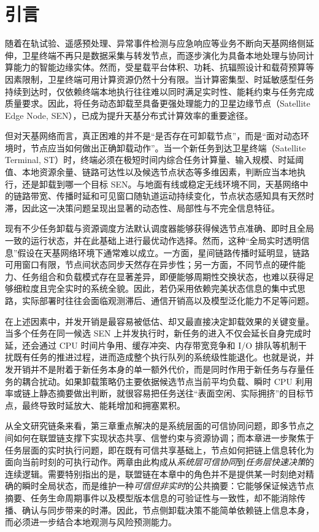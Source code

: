 \section{引言}
\label{sec:problem_statement}

随着在轨试验、遥感预处理、异常事件检测与应急响应等业务不断向天基网络侧延伸，卫星终端不再只是数据采集与转发节点，而逐步演化为具备本地处理与协同计算能力的智能边缘实体。然而，受星载平台体积、功耗、抗辐照设计和载荷预算等因素限制，卫星终端可用计算资源仍然十分有限。当计算密集型、时延敏感型任务持续到达时，仅依赖终端本地执行往往难以同时满足实时性、能耗约束与任务完成质量要求。因此，将任务动态卸载至具备更强处理能力的卫星边缘节点（Satellite Edge Node, SEN），已成为提升天基分布式计算效率的重要途径。

但对天基网络而言，真正困难的并不是“是否存在可卸载节点”，而是“面对动态环境时，节点应当如何做出正确卸载动作”。当一个新任务到达卫星终端（Satellite Terminal, ST）时，终端必须在极短时间内综合任务计算量、输入规模、时延阈值、本地资源余量、链路可达性以及候选节点状态等多维因素，判断应当本地执行，还是卸载到哪一个目标 SEN。与地面有线或稳定无线环境不同，天基网络中的链路带宽、传播时延和可见窗口随轨道运动持续变化，节点状态感知具有天然时滞，因此这一决策问题呈现出显著的动态性、局部性与不完全信息特征。

现有不少任务卸载与资源调度方法默认调度器能够获得候选节点准确、即时且全局一致的运行状态，并在此基础上进行最优动作选择。然而，这种“全局实时透明信息”假设在天基网络环境下通常难以成立。一方面，星间链路传播时延明显，链路可用窗口有限，节点间状态同步天然存在异步性；另一方面，不同节点的硬件能力、任务组合和负载模式存在显著差异，即便能够周期性交换状态，也难以获得足够细粒度且完全实时的系统全貌。因此，若仍采用依赖完美状态信息的集中式思路，实际部署时往往会面临观测滞后、通信开销高以及模型泛化能力不足等问题。

在上述因素中，并发开销是最容易被低估、却又最直接决定卸载效果的关键变量。当多个任务在同一候选 SEN 上并发执行时，新任务的进入不仅会延长自身完成时延，还会通过 CPU 时间片争用、缓存冲突、内存带宽竞争和 I/O 排队等机制干扰既有任务的推进过程，进而造成整个执行队列的系统级性能退化。也就是说，并发开销并不是附着于新任务本身的单一额外代价，而是同时作用于新任务与存量任务的耦合扰动。如果卸载策略仍主要依据候选节点当前平均负载、瞬时 CPU 利用率或链上静态摘要做出判断，就很容易把任务送往“表面空闲、实际拥挤”的目标节点，最终导致时延放大、能耗增加和拥塞累积。

从全文研究链条来看，第三章重点解决的是系统层面的可信协同问题，即多节点之间如何在联盟链支撑下实现状态共享、信誉约束与资源协调；而本章进一步聚焦于任务层面的实时执行问题，即在既有可信共享基础上，节点如何把链上信息转化为面向当前时刻的可执行动作。两章由此构成从\emph{系统层可信协同}到\emph{任务层快速决策}的连续逻辑。需要特别指出的是，联盟链在本章中的角色并不是提供某一时刻绝对精确的瞬时全局状态，而是维护一种\emph{可信但非实时}的公共摘要：它能够保证候选节点摘要、任务生命周期事件以及模型版本信息的可验证性与一致性，却不能消除传播、确认与同步带来的时滞。因此，节点侧卸载决策不能简单依赖链上信息本身，而必须进一步结合本地观测与风险预测能力。

